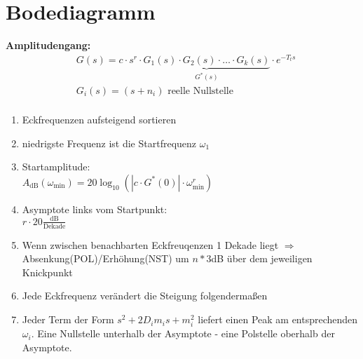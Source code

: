 \setcounter{section}{6}
\section{Bodediagramm}
\begin{tcolorbox}[colback=white!10!white,colframe=blue!50!white,title=Konstruktionsregeln]
    \textbf{Amplitudengang:}
    \begin{align*}
        &G(s) = c\cdot s^r\cdot \underbrace{G_1(s) \cdot G_2(s)\cdot \ldots \cdot G_k(s)}_{G^*(s)}\cdot e^{-T_ts}\\
        &G_i(s)  = (s+n_i)  \text{ reelle Nullstelle}\\
    \end{align*}
    \begin{enumerate}
        \item Eckfrequenzen aufsteigend sortieren
        \item niedrigste Frequenz ist die Startfrequenz $\omega_1$
        \item Startamplitude:\\ $A_{\text{dB}}(\omega_{\text{min}}) = 20 \log_{10}(|c\cdot G^{*}(0)|\cdot \omega_{\text{min}}^r)$
        \item Asymptote links vom Startpunkt:\\
        $r\cdot20 \frac{\text{dB}}{\text{Dekade}}$
        \item Wenn zwischen benachbarten Eckfreuqenzen 1 Dekade liegt $\Rightarrow$ Absenkung(POL)/Erhöhung(NST) um  $n*3$dB über dem jeweiligen Knickpunkt
        \item Jede Eckfrequenz verändert die Steigung folgendermaßen
        \item Jeder Term der Form $s^2 + 2D_im_is+m_i^2$ liefert einen Peak  am entsprechenden $\omega_i$. Eine Nullstelle unterhalb der Asymptote - eine Polstelle oberhalb der Asymptote.\\

\end{enumerate}
\end{tcolorbox}
